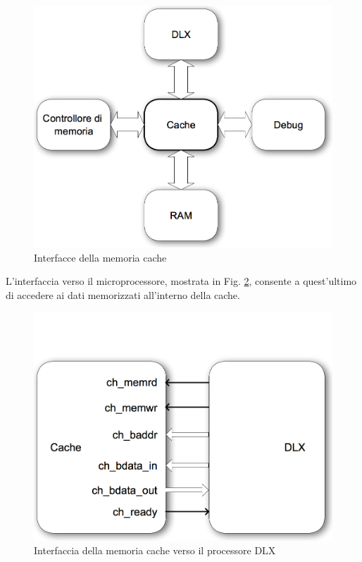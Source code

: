 \begin{figure}[h!]
\centering
\includegraphics[width=\textwidth]{img/cache/general.png}
\caption{Interfacce della memoria cache}
\label{fig:int_gen}
\end{figure}


L'interfaccia verso il microprocessore, mostrata in Fig. \ref{fig:int_dlx}, consente a quest'ultimo di accedere ai dati memorizzati all'interno della cache.

\begin{figure}[h!]
\centering
\includegraphics[width=\textwidth]{img/cache/dlx.png}
\caption{Interfaccia della memoria cache verso il processore DLX}
\label{fig:int_dlx}
\end{figure}

